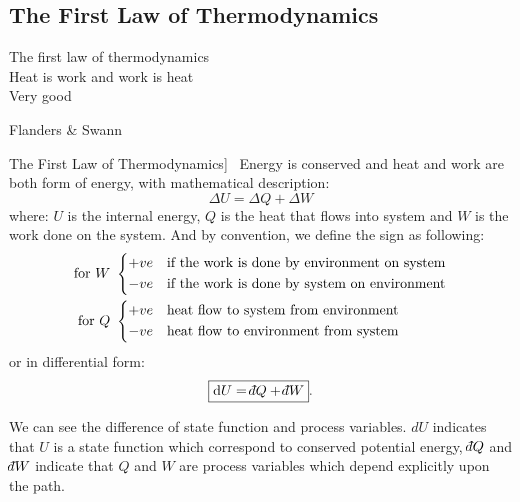 \documentclass[UTF8]{book}
\def\dbar{{\mathchar'26\mkern-12mu d}}		%
\newenvironment{theorem}[2][Theorem]{\begin{trivlist}
\item[\hskip \labelsep {\bfseries #1}\hskip \labelsep {\bfseries }]}{\end{trivlist}}
\begin{document}
\subsection{The First Law of Thermodynamics}
\epigraph{The first law of thermodynamics\\
Heat is work and work is heat \\
Very good}{Flanders \& Swann}
\begin{theorem}
[The First Law of Thermodynamics]~  {Energy is conserved and heat and work are both form of energy, with mathematical description:}
$$\boxed{\Delta U=\Delta Q+\Delta W}$$
where: $U$ is the internal energy, $Q$ is the heat that flows into system and $W$ is the work done on the system.
{And by convention, we define the sign as following:}
\begin{align*}
 \textrm{for }W\ &
   \begin{dcases}
     +ve \quad  \textrm{if the work is done by environment on system}\\
     -ve \quad  \textrm{if the work is done by system on environment}
   \end{dcases}\\
 \textrm{for }Q\ &
   \begin{dcases}
     +ve \quad  \textrm{heat flow to system from environment}\\
     -ve \quad  \textrm{heat flow to environment from system}
   \end{dcases}
\end{align*}
 {or in differential form:}
$$\boxed{\mathrm{d} U=\dbar Q+\dbar W}.$$

{We can see the difference of state function and process variables. $dU$ indicates that $U$ is a state function which correspond to conserved potential energy, $\dbar Q$ and $\dbar W$ indicate that $Q$ and $W$ are process variables which depend explicitly upon the path.}
\end{theorem}
\end{document}
